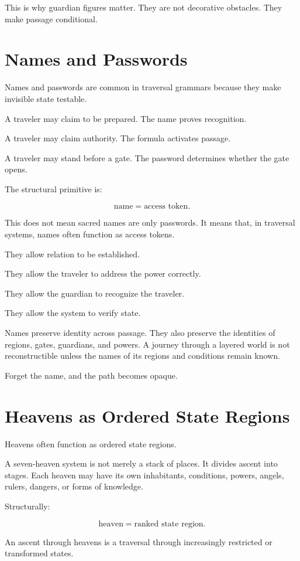 \documentclass[11pt]{book}
\begin{document}
This is why guardian figures matter. They are not decorative obstacles. They make passage conditional.

\section{Names and Passwords}

Names and passwords are common in traversal grammars because they make invisible state testable.

A traveler may claim to be prepared. The name proves recognition.

A traveler may claim authority. The formula activates passage.

A traveler may stand before a gate. The password determines whether the gate opens.

The structural primitive is:

\[
\text{name} = \text{access token}.
\]

This does not mean sacred names are only passwords. It means that, in traversal systems, names often function as access tokens.

They allow relation to be established.

They allow the traveler to address the power correctly.

They allow the guardian to recognize the traveler.

They allow the system to verify state.

Names preserve identity across passage. They also preserve the identities of regions, gates, guardians, and powers. A journey through a layered world is not reconstructible unless the names of its regions and conditions remain known.

Forget the name, and the path becomes opaque.

\section{Heavens as Ordered State Regions}

Heavens often function as ordered state regions.

A seven-heaven system is not merely a stack of places. It divides ascent into stages. Each heaven may have its own inhabitants, conditions, powers, angels, rulers, dangers, or forms of knowledge.

Structurally:

\[
\text{heaven} = \text{ranked state region}.
\]

An ascent through heavens is a traversal through increasingly restricted or transformed states.
\end{document}
